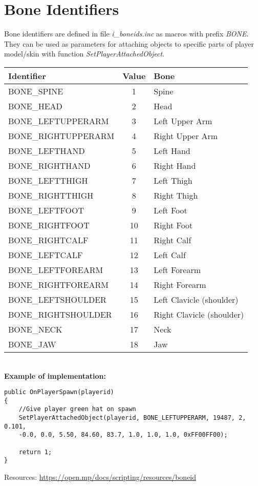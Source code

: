\documentclass{article}
\begin{document}
\section{Bone Identifiers}
\begin{sloppypar}
Bone identifiers are defined in file \textit{i\_boneids.inc} as macros with prefix \textit{BONE}. They can be used as parameters for attaching objects to specific parts of player model/skin with function \textit{SetPlayerAttachedObject}.
\end{sloppypar}
\bigskip
\noindent\begin{tabular}{ |l|c|l| } 
\hline
Identifier & Value & Bone \\
\hline
BONE\_SPINE & 1 & Spine \\
BONE\_HEAD & 2 & Head \\
BONE\_LEFTUPPERARM & 3 & Left Upper Arm \\
BONE\_RIGHTUPPERARM & 4 & Right Upper Arm \\
BONE\_LEFTHAND & 5 & Left Hand \\
BONE\_RIGHTHAND & 6 & Right Hand \\
BONE\_LEFTTHIGH & 7 & Left Thigh \\
BONE\_RIGHTTHIGH & 8 & Right Thigh \\
BONE\_LEFTFOOT & 9 & Left Foot \\
BONE\_RIGHTFOOT & 10 & Right Foot \\
BONE\_RIGHTCALF & 11 & Right Calf \\
BONE\_LEFTCALF & 12 & Left Calf \\
BONE\_LEFTFOREARM & 13 & Left Forearm \\
BONE\_RIGHTFOREARM & 14 & Right Forearm \\
BONE\_LEFTSHOULDER & 15 & Left Clavicle (shoulder) \\
BONE\_RIGHTSHOULDER & 16 & Right Clavicle (shoulder) \\
BONE\_NECK & 17 & Neck \\
BONE\_JAW & 18 & Jaw \\
\hline
\end{tabular}
\bigskip
\\\textbf{Example of implementation:}
\begin{verbatim}
public OnPlayerSpawn(playerid)
{
    //Give player green hat on spawn
    SetPlayerAttachedObject(playerid, BONE_LEFTUPPERARM, 19487, 2, 0.101, 
    -0.0, 0.0, 5.50, 84.60, 83.7, 1.0, 1.0, 1.0, 0xFF00FF00);

    return 1;
}
\end{verbatim}
\bigskip
Resources: \url{https://open.mp/docs/scripting/resources/boneid}
\end{document}

